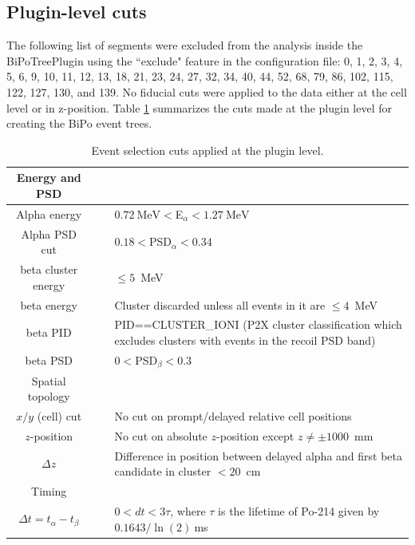 \subsection{Plugin-level cuts}
The following list of segments were excluded from the analysis inside the BiPoTreePlugin using the ``exclude" feature in the configuration file: 0, 1, 2, 3, 4, 5, 6, 9, 10, 11, 12, 13, 18, 21, 23, 24, 27, 32, 34, 40, 44, 52, 68, 79, 86, 102, 115, 122, 127, 130, and 139. No fiducial cuts were applied to the data either at the cell level or in z-position.
Table \ref{tab:plugincuts} summarizes the cuts made at the plugin level for creating the BiPo event trees.
\begin{table}
\begin{center}
\caption{\label{tab:plugincuts}Event selection cuts applied at the plugin level.}
\begin{tabular}[ht]{c c p{10.5cm}}\hline
Energy and PSD&~&~\\\hline\hline
Alpha energy &\vline& $0.72~\textrm{MeV}<$E$_{\alpha}<1.27~\textrm{MeV}$\\
Alpha PSD cut& \vline&$0.18<$PSD$_{\alpha}<0.34$\\
beta cluster energy &\vline& $\leq 5$~MeV\\
beta energy & \vline&Cluster discarded unless all events in it are $\leq 4$~MeV\\
beta PID & \vline&PID==CLUSTER\_IONI (P2X cluster classification which excludes clusters with events in the recoil PSD band)\\
beta PSD & \vline&$0<$PSD$_{\beta}<0.3$\\\hline
Spatial topology&~&~\\\hline\hline
$x/y$ (cell) cut &\vline& No cut on prompt/delayed relative cell positions\\
$z$-position&\vline& No cut on absolute $z$-position except $z\neq \pm1000$~mm\\
$\Delta z$&\vline&Difference in position between delayed alpha and first beta candidate in cluster $<20$~cm\\\hline
Timing&~&~\\\hline\hline
$\Delta t=t_{\alpha}-t_{\beta}$&\vline &$0< dt < 3\tau$, where $\tau$ is the lifetime of Po-214 given by $0.1643/\ln{(2)}~$ms\\\hline

\end{tabular}
\end{center}
\end{table}
